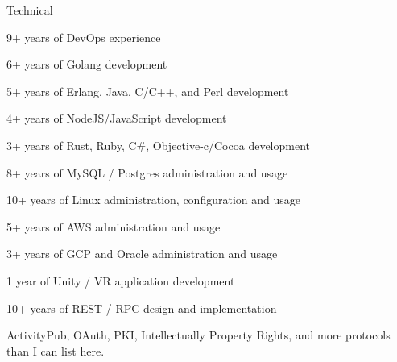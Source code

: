 \documentclass[10pt,letterpaper]{article}
\newenvironment{indentsection}[1]%
{\begin{list}{}%
  {\setlength{\leftmargin}{#1}}%
  \item[]%
}
{\end{list}}
\begin{document}
\begin{indentsection}{\parindent}
Technical
\begin{itemize*}
  \item 9+ years of DevOps experience
  \item 6+ years of Golang development
  \item 5+ years of Erlang, Java, C/C++, and Perl development
  \item 4+ years of NodeJS/JavaScript development
  \item 3+ years of Rust, Ruby, C\#, Objective-c/Cocoa development
  \item 8+ years of MySQL / Postgres administration and usage
  \item 10+ years of Linux administration, configuration and usage
  \item 5+ years of AWS administration and usage
  \item 3+ years of GCP and Oracle administration and usage
  \item 1 year of Unity / VR application development
  \item 10+ years of REST / RPC design and implementation
  \item ActivityPub, OAuth, PKI, Intellectually Property Rights, and more protocols than I can list here.
\end{itemize*}

\end{indentsection}
\end{document}

